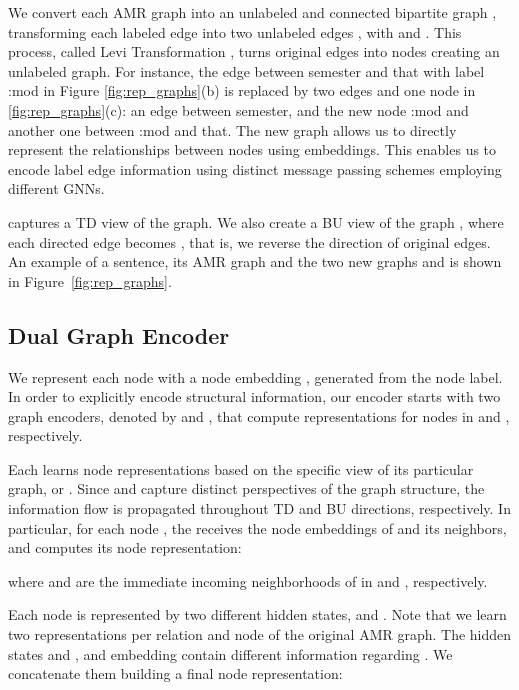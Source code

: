 \documentclass[11pt,a4paper]{article}
\begin{document}
We convert each AMR graph into an unlabeled and connected bipartite graph , transforming each labeled edge  into two unlabeled edges , with  and . This process, called Levi Transformation \cite{beck-etal-2018-acl2018}, turns original edges into nodes creating an unlabeled graph. For instance, the edge between {\selectfont semester} and {\selectfont that} with label {\selectfont :mod} in Figure \ref{fig:rep_graphs}(b) is replaced by two edges and one node in \ref{fig:rep_graphs}(c): an edge between {\selectfont semester}, and the new node {\selectfont :mod} and another one between {\selectfont :mod} and {\selectfont that}. The new graph allows us to directly represent the relationships between nodes using embeddings. This enables us to encode label edge information using distinct message passing schemes employing different GNNs.

 captures a TD view of the graph. We also create a BU view of the graph , where each directed edge  becomes , that is, we reverse the direction of original edges. An example of a sentence, its AMR graph and the two new graphs  and  is shown in Figure~\ref{fig:rep_graphs}.


\subsection{Dual Graph Encoder}





We represent each node  with a node embedding , generated from the node label. In order to explicitly encode structural information, our encoder starts with two graph encoders, denoted by  and , that compute representations for nodes in  and , respectively.

Each  learns node representations based on the specific view of its particular graph,  or . Since  and  capture distinct perspectives of the graph structure, the information flow is propagated throughout TD and BU directions, respectively. In particular, for each node , the  receives the node embeddings of  and its neighbors, and computes its node representation:
 
where  and  are the immediate incoming neighborhoods of  in  and , respectively.


Each node  is represented by two different hidden states,  and . Note that we learn two representations per relation and node of the original AMR graph. The hidden states  and , and embedding  contain different information regarding . We concatenate them building a final node representation:
\end{document}
